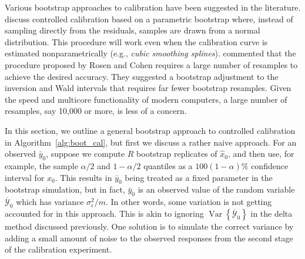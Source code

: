 \documentclass[cmfont,usenames,dvipsnames,leqno]{afit-etd}\usepackage[]{graphicx}\usepackage[]{color}
\newcommand{\mc}[1]{\ensuremath{\mathcal{#1}}}
\newcommand{\wh}[1]{\ensuremath{\widehat{#1}}}
\newcommand{\wb}[1]{\ensuremath{\overline{#1}}}
\newcommand{\var}{\operatorname{Var}}
\begin{document}
Various bootstrap approaches to calibration have been suggested in the literature. \citet{rosen_constructing_1995} discuss controlled calibration based on a parametric bootstrap where, instead of sampling directly from the residuals, samples are drawn from a normal distribution. This procedure will work even when the calibration curve is estimated nonparametrically (e.g., \textit{cubic smoothing splines}). \citet{zeng_bootstrap-adjusted_1997} commented that the procedure proposed by Rosen and Cohen requires a large number of resamples to achieve the desired accuracy. They suggested a bootstrap adjustment to the inversion and Wald intervals that requires far fewer bootstrap resamples. Given the speed and multicore functionality of modern computers, a large number of resamples, say 10,000 or more, is less of a concern. 

In this section, we outline a general bootstrap approach to controlled calibration in Algorithm~\ref{alg:boot_cal}, but first we discuss a rather naive approach. For an observed $\bar{y}_0$, suppose we compute $R$ bootstrap replicates of $\wh{x}_0$, and then use, for example, the sample $\alpha/2$ and $1 - \alpha/2$ quantiles as a $100(1 - \alpha)\%$ confidence interval for $x_0$. This results in $\bar{y}_0$ being treated as a fixed parameter in the bootstrap simulation, but in fact, $\bar{y}_0$ is an observed value of the random variable $\wb{\mc{Y}}_0$ which has variance $\sigma_\epsilon^2/m$. In other words, some variation is not getting accounted for in this approach. This is akin to ignoring $\var\left\{\wb{\mc{Y}}_0\right\}$ in the delta method discussed previously. One solution is to simulate the correct variance by adding a small amount of noise to the observed responses from the second stage of the calibration experiment.
\end{document}
